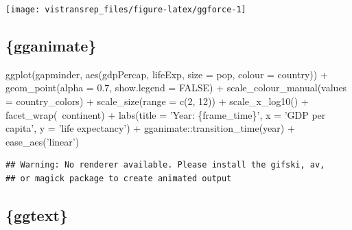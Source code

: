 \documentclass[]{book}
\newenvironment{Shaded}{}{}
\newcommand{\DataTypeTok}[1]{#1}
\newcommand{\DecValTok}[1]{#1}
\newcommand{\FloatTok}[1]{#1}
\newcommand{\KeywordTok}[1]{\textcolor[rgb]{0.00,0.00,1.00}{#1}}
\newcommand{\NormalTok}[1]{#1}
\newcommand{\OperatorTok}[1]{#1}
\newcommand{\OtherTok}[1]{\textcolor[rgb]{1.00,0.25,0.00}{#1}}
\newcommand{\StringTok}[1]{\textcolor[rgb]{0.00,0.50,0.50}{#1}}
\begin{document}
\begin{flushright}\texttt{[image: vistransrep\_files/figure-latex/ggforce-1]} \end{flushright}

\hypertarget{gganimate-1}{%
\subsection{\{gganimate\}}\label{gganimate-1}}

\begin{Shaded}
\begin{Highlighting}[]
\KeywordTok{ggplot}\NormalTok{(gapminder, }\KeywordTok{aes}\NormalTok{(gdpPercap, lifeExp, }\DataTypeTok{size =}\NormalTok{ pop, }\DataTypeTok{colour =}\NormalTok{ country)) }\OperatorTok{+}
\StringTok{  }\KeywordTok{geom_point}\NormalTok{(}\DataTypeTok{alpha =} \FloatTok{0.7}\NormalTok{, }\DataTypeTok{show.legend =} \OtherTok{FALSE}\NormalTok{) }\OperatorTok{+}
\StringTok{  }\KeywordTok{scale_colour_manual}\NormalTok{(}\DataTypeTok{values =}\NormalTok{ country_colors) }\OperatorTok{+}
\StringTok{  }\KeywordTok{scale_size}\NormalTok{(}\DataTypeTok{range =} \KeywordTok{c}\NormalTok{(}\DecValTok{2}\NormalTok{, }\DecValTok{12}\NormalTok{)) }\OperatorTok{+}
\StringTok{  }\KeywordTok{scale_x_log10}\NormalTok{() }\OperatorTok{+}
\StringTok{  }\KeywordTok{facet_wrap}\NormalTok{(}\OperatorTok{~}\NormalTok{continent) }\OperatorTok{+}
\StringTok{  }\KeywordTok{labs}\NormalTok{(}\DataTypeTok{title =} \StringTok{'Year: \{frame_time\}'}\NormalTok{, }\DataTypeTok{x =} \StringTok{'GDP per capita'}\NormalTok{, }\DataTypeTok{y =} \StringTok{'life expectancy'}\NormalTok{) }\OperatorTok{+}
\StringTok{  }\NormalTok{gganimate}\OperatorTok{::}\KeywordTok{transition_time}\NormalTok{(year) }\OperatorTok{+}
\StringTok{  }\KeywordTok{ease_aes}\NormalTok{(}\StringTok{'linear'}\NormalTok{)}
\end{Highlighting}
\end{Shaded}

\begin{verbatim}
## Warning: No renderer available. Please install the gifski, av,
## or magick package to create animated output
\end{verbatim}

\hypertarget{ggtext}{%
\subsection{\{ggtext\}}\label{ggtext}}
\end{document}
